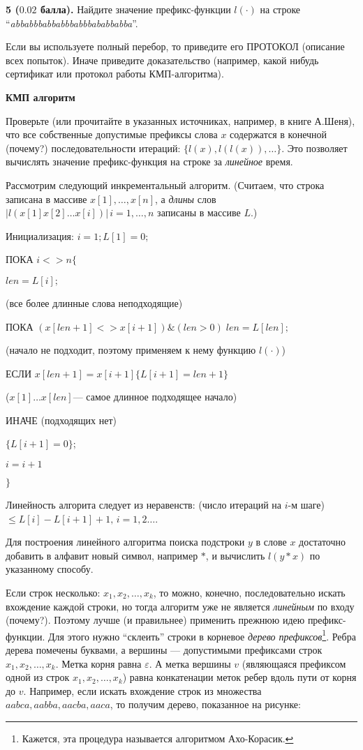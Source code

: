 \documentclass[10pt,twocolumn]{article}
\let\eps\varepsilon
\begin{document}
{\bf 5 ($0.02$ балла).} Найдите значение префикс-функции $l(\cdot)$ на
строке ``{\em abbabbbabbabbbabbbababbabba}''.

 

{\footnotesize
 Если вы используете полный перебор, то приведите его ПРОТОКОЛ (описание всех попыток).
Иначе приведите доказательство (например, какой нибудь сертификат 
или протокол работы КМП-алгоритма).

\medskip

\centerline{\bf КМП алгоритм}
\smallskip

Проверьте (или прочитайте в указанных источниках, например, в книге А.Шеня), что все собственные допустимые
префиксы слова $x$ содержатся в конечной (почему?) последовательности
итераций:  $\{l(x), l(l(x)),\dots\}$.
Это позволяет
вычислять значение префикс-функция на строке за {\em линейное} время.

Рассмотрим следующий инкрементальный алгоритм.
(Считаем, что строка записана в массиве $x[1],\dots,x[n]$, а {\em длины} слов $|l(x[1]x[2]\dots x[i])|\,
i=1,\dots,n$ записаны в массиве $L$.)

Инициализация: $i=1; L[1]=0; $

ПОКА $i <> n \{$

$len = L[i];$ 

(все более длинные слова неподходящие)

ПОКА $(x[len+1] <> x[i+1]) \& (len > 0) \; len=L[len];$

(начало не подходит, поэтому применяем к нему функцию $l(\cdot)$)

ЕСЛИ $x[len+1]=x[i+1] \{ L[i+1]=len+1 \}$

($x[1]\dots x[len]$--- самое длинное подходящее начало)

ИНАЧЕ   (подходящих нет)

 $\{L[i+1]=0\}$;

$i=i+1$

$\}$

Линейность алгорита следует из неравенств:
(число итераций на $i$-м шаге) $\leq L[i] - L[i+1] +1, \, i=1,2 \dots$.

Для построения линейного алгоритма поиска подстроки $y$ в слове $x$ достаточно добавить в алфавит
новый символ, например $\ast$, и вычислить  $l(y\ast x)$ по указанному способу.


Если строк несколько: $x_1, x_2, \dots,
x_k$, то можно, конечно, последовательно искать вхождение каждой
строки, но тогда алгоритм уже не является {\em линейным} по входу
(почему?).  Поэтому лучше (и правильнее) применить прежнюю идею
префикс-функции.  Для этого нужно ``склеить'' строки в корневое 
{\em дерево префиксов}\footnote{Кажется, эта процедура называется алгоритмом Ахо-Корасик.}. Ребра
дерева помечены буквами, а вершины --- допустимыми префиксами строк 
$x_1, x_2, \dots, x_k$. Метка корня равна $\eps$. А метка вершины $v$ (являющаяся префиксом одной из строк
$x_1, x_2, \dots, x_k$)
равна конкатенации меток ребер вдоль пути от корня до $v$. 
Например, если искать вхождение
строк из множества $aabca, aabba, aacba, aaca$, то получим дерево,
показанное на рисунке:}
\end{document}
